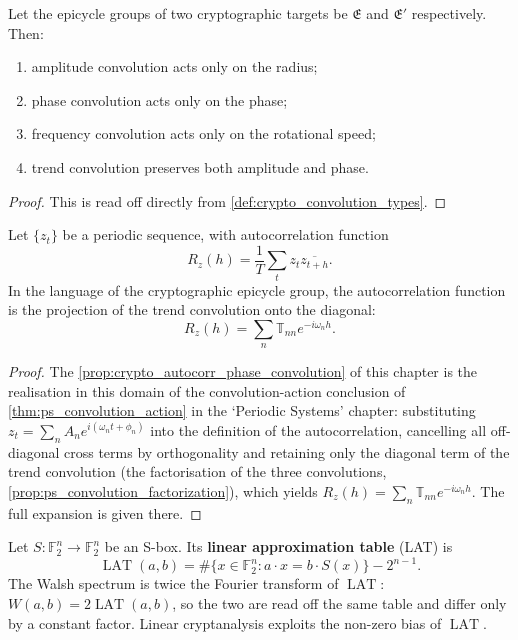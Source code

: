 \begin{theorem}\label{thm:crypto_convolution_action}
Let the epicycle groups of two cryptographic targets be \(\mathfrak E\) and \(\mathfrak E'\) respectively. Then:
\begin{enumerate}[label=(\roman*)]
    \item amplitude convolution acts only on the radius;
    \item phase convolution acts only on the phase;
    \item frequency convolution acts only on the rotational speed;
    \item trend convolution preserves both amplitude and phase.
\end{enumerate}
\end{theorem}

\begin{proof}
This is read off directly from \cref{def:crypto_convolution_types}.
\end{proof}

\begin{proposition}\label{prop:crypto_autocorr_phase_convolution}
Let \(\{z_t\}\) be a periodic sequence, with autocorrelation function
\[
R_z(h)=\frac1T\sum_t z_t\overline{z_{t+h}}.
\]
In the language of the cryptographic epicycle group, the autocorrelation function is the projection of the trend convolution onto the diagonal:
\[
R_z(h)=\sum_n\mathbb T_{nn}e^{-i\omega_n h}.
\]
\end{proposition}

\begin{proof}
The \cref{prop:crypto_autocorr_phase_convolution} of this chapter is the realisation in this domain of the convolution-action conclusion of \cref{thm:ps_convolution_action} in the `Periodic Systems' chapter:
substituting $z_t=\sum_n A_n e^{i(\omega_n t+\phi_n)}$ into the definition of the autocorrelation, cancelling all off-diagonal cross terms by orthogonality and retaining only the diagonal term of the trend convolution
(the factorisation of the three convolutions, \cref{prop:ps_convolution_factorization}), which yields $R_z(h)=\sum_n\mathbb T_{nn}e^{-i\omega_n h}$.
The full expansion is given there.
\end{proof}

\begin{definition}\label{def:walsh_lat}
Let \(S:\mathbb F_2^n\to\mathbb F_2^n\) be an S-box. Its \textbf{linear approximation table} (LAT) is
\[
\operatorname{LAT}(a,b)=\#\{x\in\mathbb F_2^n:a\cdot x=b\cdot S(x)\}-2^{n-1}.
\]
The Walsh spectrum is twice the Fourier transform of \(\operatorname{LAT}\): \(W(a,b)=2\operatorname{LAT}(a,b)\), so the two are read off the same table and differ only by a constant factor. Linear cryptanalysis exploits the non-zero bias of \(\operatorname{LAT}\).
\end{definition}


